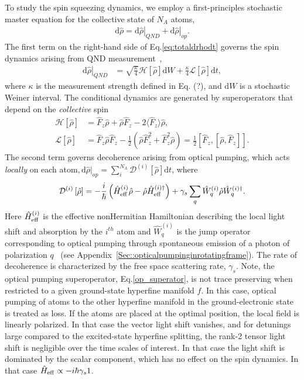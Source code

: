 \documentclass[preprint,aps,pra,onecolumn,superscriptaddress]{revtex4-1} %
\newcommand{\expect}[1]{\big\langle #1 \big\rangle}
\begin{document}
To study the spin squeezing dynamics, we employ a first-principles stochastic master equation for the collective state of $N_A$ atoms,
\begin{align}\label{eq:totaldrhodt}
\mathrm{d}\hat{\rho}= \left.\mathrm{d}\hat{\rho}\right|_{QND}+\left.\mathrm{d}\hat{\rho}\right|_{op}.
\end{align}
The first term on the right-hand side of Eq.\eqref{eq:totaldrhodt} governs the spin dynamics arising from QND measurement~\cite{?},
\begin{align}
\left.\mathrm{d}\hat{\rho}\right|_{QND} &= \sqrt{\frac{\kappa}{4}}\mathcal{H}\left[\hat{\rho} \right]\mathrm{d}W + \frac{\kappa}{4}\mathcal{L}\left[ \hat{\rho}\right]\mathrm{d}t, 
\end{align}
where  $\kappa$ is the measurement strength defined in Eq. (?), and $\mathrm{d}W$ is a stochastic Weiner interval. The conditional dynamics are generated by superoperators that depend on the {\em collective} spin
\begin{subequations}
\begin{align}
\mathcal{H}\left[ \hat{\rho}\right] &= \hat{F}_z \hat{\rho} + \hat{\rho}\hat{F}_z -2\expect{\hat{F}_z}\hat{\rho}, \\
\mathcal{L}\left[ \hat{\rho} \right] &= \hat{F}_z \hat{\rho}\hat{F}_z -\frac{1}{2}\left(\hat{\rho}\hat{F}_z^2+\hat{F}_z^2\hat{\rho} \right)=\frac{1}{2}\left[\hat{F}_z,\left[\hat{\rho},\hat{F}_z \right] \right].
\end{align}
\end{subequations}
The second term governs decoherence arising from optical pumping, which acts {\em locally} on each atom$,\mathrm{d}\hat{\rho}|_{op}=\sum_i^{N_A} \mathcal{D}^{(i)}\left[ \hat{\rho}\right] \mathrm{d}t$, where 
\begin{equation}
\mathcal{D}^{(i)}\left[ \hat{\rho}\right] = -\frac{i}{\hbar}\left(\hat{H}^{(i)}_{\rm eff}\hat{\rho} - \hat{\rho} \hat{H}^{(i)\dag}_{\rm eff}\right) + \gamma_s\sum_q \hat{W}^{(i)}_q \hat{\rho}\hat{W}^{(i)\dag}_q.
\label{op_superator}
\end{equation}
Here $\hat{H}^{(i)}_{\rm eff}$ is the effective nonHermitian Hamiltonian describing the local light shift and absorption by the $i^{th}$ atom and $\hat{W}^{(i)}_q$ is the jump operator corresponding to optical pumping through spontaneous emission of a photon of polarization $q$~\cite{Deutsch2010a} (see Appendix~\ref{Sec::opticalpumpinginrotatingframe}).   
The rate of decoherence is characterized by the free space scattering rate, $\gamma_s$.  Note, the optical pumping superoperator, Eq.\eqref{op_superator},  is not trace preserving when restricted to a given ground-state hyperfine manifold $f$.  In this case, optical pumping of atoms to the other hyperfine manifold in the ground-electronic state is treated as loss.  If the atoms are placed at the optimal position, the local field is linearly polarized.  In that case the vector light shift vanishes, and for detunings large compared to the excited-state hyperfine splitting, the rank-2 tensor light shift is negligible over the time scales of interest.  In that case the light shift is dominated by the scalar component, which has no effect on the spin dynamics.  In that case $\hat{H}_{\rm eff} \propto -i\hbar \gamma_s 1$.
\end{document}
